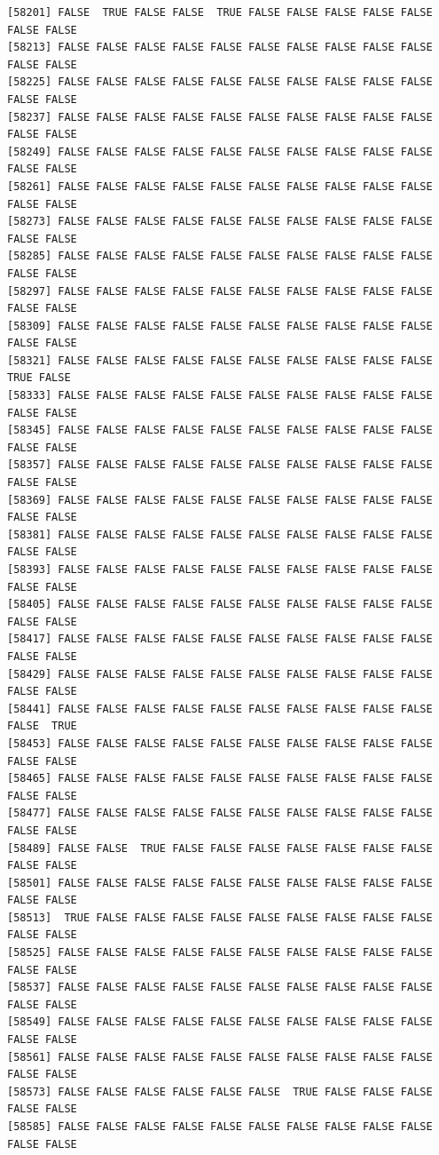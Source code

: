 \documentclass[
  a4paper,
  DIV=11,
  numbers=noendperiod]{scrartcl}
\begin{document}
\begin{verbatim}
[58201] FALSE  TRUE FALSE FALSE  TRUE FALSE FALSE FALSE FALSE FALSE FALSE FALSE
[58213] FALSE FALSE FALSE FALSE FALSE FALSE FALSE FALSE FALSE FALSE FALSE FALSE
[58225] FALSE FALSE FALSE FALSE FALSE FALSE FALSE FALSE FALSE FALSE FALSE FALSE
[58237] FALSE FALSE FALSE FALSE FALSE FALSE FALSE FALSE FALSE FALSE FALSE FALSE
[58249] FALSE FALSE FALSE FALSE FALSE FALSE FALSE FALSE FALSE FALSE FALSE FALSE
[58261] FALSE FALSE FALSE FALSE FALSE FALSE FALSE FALSE FALSE FALSE FALSE FALSE
[58273] FALSE FALSE FALSE FALSE FALSE FALSE FALSE FALSE FALSE FALSE FALSE FALSE
[58285] FALSE FALSE FALSE FALSE FALSE FALSE FALSE FALSE FALSE FALSE FALSE FALSE
[58297] FALSE FALSE FALSE FALSE FALSE FALSE FALSE FALSE FALSE FALSE FALSE FALSE
[58309] FALSE FALSE FALSE FALSE FALSE FALSE FALSE FALSE FALSE FALSE FALSE FALSE
[58321] FALSE FALSE FALSE FALSE FALSE FALSE FALSE FALSE FALSE FALSE  TRUE FALSE
[58333] FALSE FALSE FALSE FALSE FALSE FALSE FALSE FALSE FALSE FALSE FALSE FALSE
[58345] FALSE FALSE FALSE FALSE FALSE FALSE FALSE FALSE FALSE FALSE FALSE FALSE
[58357] FALSE FALSE FALSE FALSE FALSE FALSE FALSE FALSE FALSE FALSE FALSE FALSE
[58369] FALSE FALSE FALSE FALSE FALSE FALSE FALSE FALSE FALSE FALSE FALSE FALSE
[58381] FALSE FALSE FALSE FALSE FALSE FALSE FALSE FALSE FALSE FALSE FALSE FALSE
[58393] FALSE FALSE FALSE FALSE FALSE FALSE FALSE FALSE FALSE FALSE FALSE FALSE
[58405] FALSE FALSE FALSE FALSE FALSE FALSE FALSE FALSE FALSE FALSE FALSE FALSE
[58417] FALSE FALSE FALSE FALSE FALSE FALSE FALSE FALSE FALSE FALSE FALSE FALSE
[58429] FALSE FALSE FALSE FALSE FALSE FALSE FALSE FALSE FALSE FALSE FALSE FALSE
[58441] FALSE FALSE FALSE FALSE FALSE FALSE FALSE FALSE FALSE FALSE FALSE  TRUE
[58453] FALSE FALSE FALSE FALSE FALSE FALSE FALSE FALSE FALSE FALSE FALSE FALSE
[58465] FALSE FALSE FALSE FALSE FALSE FALSE FALSE FALSE FALSE FALSE FALSE FALSE
[58477] FALSE FALSE FALSE FALSE FALSE FALSE FALSE FALSE FALSE FALSE FALSE FALSE
[58489] FALSE FALSE  TRUE FALSE FALSE FALSE FALSE FALSE FALSE FALSE FALSE FALSE
[58501] FALSE FALSE FALSE FALSE FALSE FALSE FALSE FALSE FALSE FALSE FALSE FALSE
[58513]  TRUE FALSE FALSE FALSE FALSE FALSE FALSE FALSE FALSE FALSE FALSE FALSE
[58525] FALSE FALSE FALSE FALSE FALSE FALSE FALSE FALSE FALSE FALSE FALSE FALSE
[58537] FALSE FALSE FALSE FALSE FALSE FALSE FALSE FALSE FALSE FALSE FALSE FALSE
[58549] FALSE FALSE FALSE FALSE FALSE FALSE FALSE FALSE FALSE FALSE FALSE FALSE
[58561] FALSE FALSE FALSE FALSE FALSE FALSE FALSE FALSE FALSE FALSE FALSE FALSE
[58573] FALSE FALSE FALSE FALSE FALSE FALSE  TRUE FALSE FALSE FALSE FALSE FALSE
[58585] FALSE FALSE FALSE FALSE FALSE FALSE FALSE FALSE FALSE FALSE FALSE FALSE

\end{verbatim}
\end{document}
